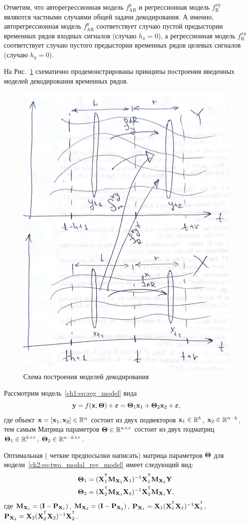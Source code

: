 Отметим, что авторегрессионная модель $f_{\text{AR}}^y$ и регрессионная модель $f_{\text{R}}^{xy}$ являются частными случаями общей задачи декодирования. А именно, авторегрессионная модель $f_{\text{AR}}^y$ соответствует случаю пустой предыстории временных рядов входных сигналов (случаю $h_x = 0$), а регрессионная модель $f_{\text{R}}^{xy}$ соответствует случаю пустого предыстории временных рядов целевых сигналов (случаю $h_y = 0$).

На Рис.~\ref{ch2:time_series_decoding} схематично продемонстрированы принципы построения введенных моделей декодирования временных рядов.

\begin{figure}
	\centering
	\includegraphics[width=0.5\linewidth]{figs/ch2/time_series_decoding}
	\caption{Схема построения моделей декодирования}
	\label{ch2:time_series_decoding}
\end{figure}

Рассмотрим модель~\eqref{ch1:eq:reg_model} вида
\begin{equation}
	\mathbf{y} = f(\mathbf{x}, \boldsymbol{\Theta}) + \boldsymbol{\varepsilon} = \boldsymbol{\Theta}_1 \mathbf{x}_1 + \boldsymbol{\Theta}_2 \mathbf{x}_2 + \boldsymbol{\varepsilon},
	\label{ch2:eq:two_modal_reg_model}
\end{equation}
где объект $\mathbf{x} = [\mathbf{x}_1, \mathbf{x}_2] \in \mathbb{R}^n$ состоит из двух подвекторов $\mathbf{x}_1 \in \mathbb{R}^k$, $\mathbf{x}_2 \in \mathbb{R}^{n - k}$, тем самым  Матрица параметров $\boldsymbol{\Theta} \in \mathbb{R}^{n \times r}$ состоит из двух подматриц $\boldsymbol{\Theta}_1 \in \mathbb{R}^{k \times r}$, $\boldsymbol{\Theta}_2 \in \mathbb{R}^{n - k \times r}$. 

\begin{statement}
	\label{stat:two_modal_params}
	Оптимальная ({\color{red} четкие предпосылки написать}) матрица параметров $\boldsymbol{\Theta}$ для модели~\eqref{ch2:eq:two_modal_reg_model} имеет следующий вид:
	\begin{align*}
		\bTheta_1 &= (\bX_1^{\T} \bM_{\bX_2} \bX_1)^{-1} \bX_1^{\T} \bM_{\bX_2} \bY \\
		\bTheta_2 &= (\bX_2^{\T} \bM_{\bX_1} \bX_2)^{-1} \bX_2^{\T} \bM_{\bX_1} \bY,
	\end{align*}
	где $\mathbf{M}_{\mathbf{X}_1} = (\mathbf{I} - \mathbf{P}_{\mathbf{X}_1})$, $\mathbf{M}_{\mathbf{X}_2} = (\mathbf{I} - \mathbf{P}_{\mathbf{X}_2})$, $\bP_{\bX_1} = \bX_1 (\bX_1^{\T} \bX_1)^{-1} \bX_1^{\T}$, $\bP_{\bX_2} = \bX_2 (\bX_2^{\T} \bX_2)^{-1} \bX_2^{\T}$.
\end{statement}

